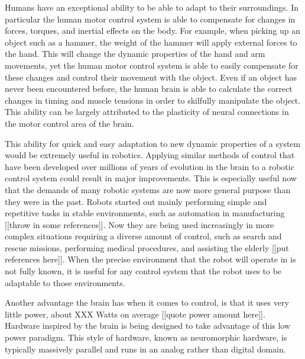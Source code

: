 \documentclass[letterpaper,12pt,titlepage,oneside,final]{book}
\begin{document}
Humans have an exceptional ability to be able to adapt to their surroundings.
In particular the human motor control system is able to compensate for changes in forces, torques, and inertial effects on the body.
For example, when picking up an object such as a hammer, the weight of the hammer will apply external forces to the hand.
This will change the dynamic properties of the hand and arm movements, yet the human motor control system is able to easily compensate for these changes and control their movement with the object.
Even if an object has never been encountered before, the human brain is able to calculate the correct changes in timing and muscle tensions in order to skilfully manipulate the object. %
This ability can be largely attributed to the plasticity of neural connections in the motor control area of the brain.

This ability for quick and easy adaptation to new dynamic properties of a system would be extremely useful in robotics. 
Applying similar methods of control that have been developed over millions of years of evolution in the brain to a robotic control system could result in major improvements. 
This is especially useful now that the demands of many robotic systems are now more general purpose than they were in the past. 
Robots started out mainly performing simple and repetitive tasks in stable environments, such as automation in manufacturing [[throw in some references]]. 
Now they are being used increasingly in more complex situations requiring a diverse amount of control, such as search and rescue missions, performing medical procedures, and assisting the elderly [[put references here]]. 
When the precise environment that the robot will operate in is not fully known, it is useful for any control system that the robot uses to be adaptable to those environments.

Another advantage the brain has when it comes to control, is that it uses very little power, about XXX Watts on average [[quote power amount here]]. 
Hardware inspired by the brain is being designed to take advantage of this low power paradigm. 
This style of hardware, known as neuromorphic hardware, is typically massively parallel and runs in an analog rather than digital domain.
\end{document}
